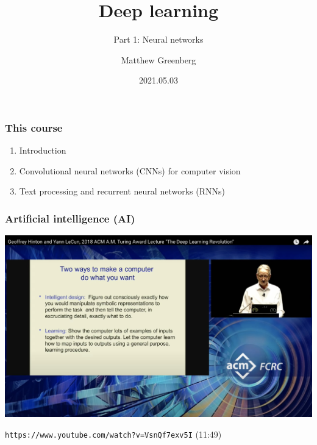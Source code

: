 \documentclass{beamer}
\title{Deep learning}
\subtitle{Part 1: Neural networks}
\author{Matthew Greenberg}
\date{2021.05.03}
\begin{document}
    \begin{frame}
    \maketitle
    \end{frame}

    \begin{frame}
        \frametitle{This course}
    
        \begin{enumerate}
            \setlength\itemsep{1em}
            \item Introduction
            
            \item Convolutional neural networks (CNNs) for computer vision
            
            \item Text processing and recurrent neural networks (RNNs)
        \end{enumerate}
    
    \end{frame}

    \begin{frame}
        \frametitle{Artificial intelligence (AI)}

        \includegraphics[width=\textwidth]{hinton-two-ways.jpg}

        \texttt{https://www.youtube.com/watch?v=VsnQf7exv5I} (11:49)
    \end{frame}
\end{document}
